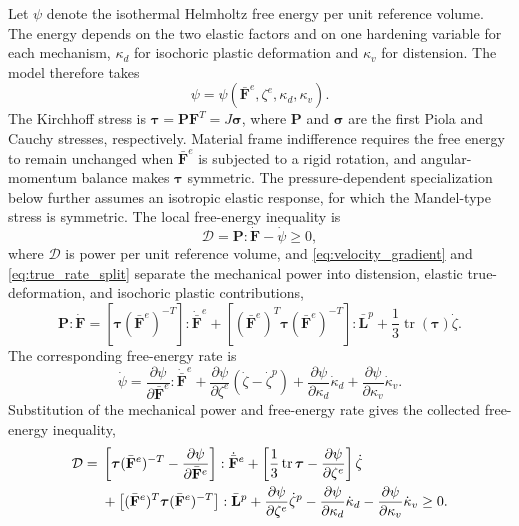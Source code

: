 \documentclass[11pt]{article}
\newcommand{\mbf}[1]{\mathbf{#1}}
\newcommand{\bs}[1]{\boldsymbol{#1}}
\newcommand{\tr}{\operatorname{tr}}
\begin{document}
Let \(\psi\) denote the isothermal Helmholtz free energy per unit reference
volume.  The energy depends on the two elastic factors and on one hardening
variable for each mechanism, \(\kappa_d\) for isochoric plastic deformation and
\(\kappa_v\) for distension.  The model therefore takes
\begin{equation*}
	\psi=\psi
	\left(
	\bar{\mbf F}^{e},\zeta^e,\kappa_d,\kappa_v
	\right).
\end{equation*}
The Kirchhoff stress is \(\bs\tau=\mbf P\mbf F^T=J\bs\sigma\),
where \(\mbf P\) and \(\bs\sigma\) are the first Piola and Cauchy
stresses, respectively.
Material frame indifference requires the free energy to remain unchanged when
\(\bar{\mbf F}^{e}\) is subjected to a rigid rotation, and angular-momentum balance
makes \(\bs\tau\) symmetric.  The pressure-dependent specialization below
further assumes an isotropic elastic response, for which the Mandel-type
stress is symmetric.  The local free-energy inequality is
\begin{equation*}
	\mathcal D
	=\mbf P:\dot{\mbf F}-\dot\psi
	\ge 0,
\end{equation*}
where \(\mathcal D\) is power per unit reference volume, and
\eqref{eq:velocity_gradient} and \eqref{eq:true_rate_split} separate the
mechanical power into distension, elastic true-deformation, and isochoric
plastic contributions,
\begin{equation*}
	\mbf P:\dot{\mbf F}
	=\left[\bs\tau(\bar{\mbf F}^{e})^{-T}\right]:\dot{\bar{\mbf F}}^{e}
	+\left[(\bar{\mbf F}^{e})^T\bs\tau(\bar{\mbf F}^{e})^{-T}\right]:\bar{\mbf L}^{p}
	+\frac{1}{3}\tr(\bs\tau)\dot\zeta.
\end{equation*}
The corresponding free-energy rate is
\begin{equation*}
	\dot\psi=
	\frac{\partial\psi}{\partial\bar{\mbf F}^{e}}
	:\dot{\bar{\mbf F}}^{e}
	+\frac{\partial\psi}{\partial\zeta^e}
	\left(\dot\zeta-\dot\zeta^p\right)
	+\frac{\partial\psi}{\partial\kappa_d}\dot\kappa_d
	+\frac{\partial\psi}{\partial\kappa_v}\dot\kappa_v.
\end{equation*}
Substitution of the mechanical power and free-energy rate gives the collected
free-energy inequality,
\begin{align}
	\mathcal D={} &
	\left[
		\bs\tau(\bar{\mbf F}^{e})^{-T}
		-\frac{\partial\psi}{\partial\bar{\mbf F}^{e}}
		\right]:\dot{\bar{\mbf F}}^{e}
	+\left[
		\frac{1}{3}\tr\bs\tau
		-\frac{\partial\psi}{\partial\zeta^e}
		\right]\dot\zeta
	\notag                  \\
	              & +\left[
		(\bar{\mbf F}^{e})^T\bs\tau(\bar{\mbf F}^{e})^{-T}
		\right]:\bar{\mbf L}^{p}
	+\frac{\partial\psi}{\partial\zeta^e}\dot\zeta^p
	-\frac{\partial\psi}{\partial\kappa_d}\dot\kappa_d
	-\frac{\partial\psi}{\partial\kappa_v}\dot\kappa_v
	\ge0.
	\label{eq:collected_free_energy_inequality}
\end{align}
\end{document}
